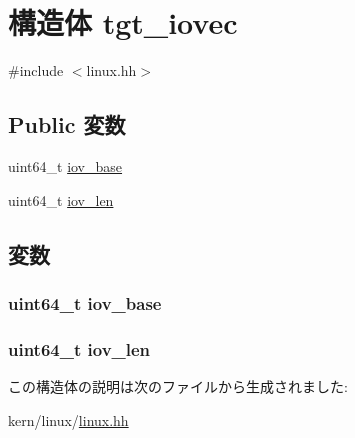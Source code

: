 \hypertarget{structLinux_1_1tgt__iovec}{
\section{構造体 tgt\_\-iovec}
\label{structLinux_1_1tgt__iovec}
}


{\ttfamily \#include $<$linux.hh$>$}\subsection*{Public 変数}
\begin{DoxyCompactItemize}
\item 
uint64\_\-t \hyperlink{structLinux_1_1tgt__iovec_ac59b8387398fca5cb863b59eb13a8363}{iov\_\-base}
\item 
uint64\_\-t \hyperlink{structLinux_1_1tgt__iovec_a530d392bf52a29de04bb57ffd97bef5d}{iov\_\-len}
\end{DoxyCompactItemize}


\subsection{変数}
\hypertarget{structLinux_1_1tgt__iovec_ac59b8387398fca5cb863b59eb13a8363}{
\subsubsection[{iov\_\-base}]{\setlength{\rightskip}{0pt plus 5cm}uint64\_\-t {\bf iov\_\-base}}}
\label{structLinux_1_1tgt__iovec_ac59b8387398fca5cb863b59eb13a8363}
\hypertarget{structLinux_1_1tgt__iovec_a530d392bf52a29de04bb57ffd97bef5d}{
\subsubsection[{iov\_\-len}]{\setlength{\rightskip}{0pt plus 5cm}uint64\_\-t {\bf iov\_\-len}}}
\label{structLinux_1_1tgt__iovec_a530d392bf52a29de04bb57ffd97bef5d}


この構造体の説明は次のファイルから生成されました:\begin{DoxyCompactItemize}
\item 
kern/linux/\hyperlink{kern_2linux_2linux_8hh}{linux.hh}\end{DoxyCompactItemize}
